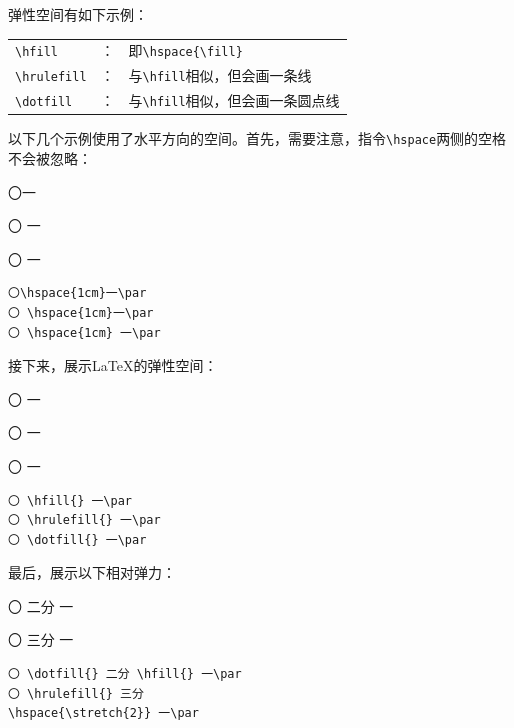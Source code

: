 弹性空间有如下示例：

  \begin{tabular}{lcl}%
    \verb|\hfill| & ：& 即\verb+\hspace{\fill}+\\
    \verb|\hrulefill| & ：& 与\verb+\hfill+相似，但会画一条线\\
    \verb|\dotfill| & ：& 与\verb+\hfill+相似，但会画一条圆点线\\
  \end{tabular}

以下几个示例使用了水平方向的空间。首先，需要注意，指令\verb|\hspace|两侧的空格不会被忽略：

\begin{codelist}[4.4]{
〇\hspace{1cm}一\par
〇 \hspace{1cm}一\par
〇 \hspace{1cm} 一\par
}
\begin{verbatim}
〇\hspace{1cm}一\par
〇 \hspace{1cm}一\par
〇 \hspace{1cm} 一\par\end{verbatim}
\end{codelist}

接下来，展示\LaTeX 的弹性空间：

\begin{codelist}[4.5]{
〇 \hfill{} 一\par
〇 \hrulefill{} 一\par
〇 \dotfill{} 一\par
}
\begin{verbatim}
〇 \hfill{} 一\par
〇 \hrulefill{} 一\par
〇 \dotfill{} 一\par\end{verbatim}
\end{codelist}

最后，展示以下相对弹力：

\begin{codelist}[4.6]{
〇 \dotfill{} 二分 \hfill{} 一\par
〇 \hrulefill{} 三分
 一\par
}
\begin{verbatim}
〇 \dotfill{} 二分 \hfill{} 一\par
〇 \hrulefill{} 三分
\hspace{\stretch{2}} 一\par\end{verbatim}
\end{codelist}


